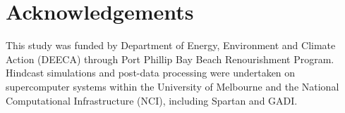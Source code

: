 \documentclass[12pt]{article}
\begin{document}
\newpage
\section*{Acknowledgements}

This study was funded by Department of Energy, Environment and Climate Action (DEECA) through Port Phillip Bay Beach Renourishment Program. Hindcast simulations and post-data processing were undertaken on supercomputer systems within the University of Melbourne and the National Computational Infrastructure (NCI), including Spartan and GADI.

\newpage
\printbibliography

\newpage
\end{document}
